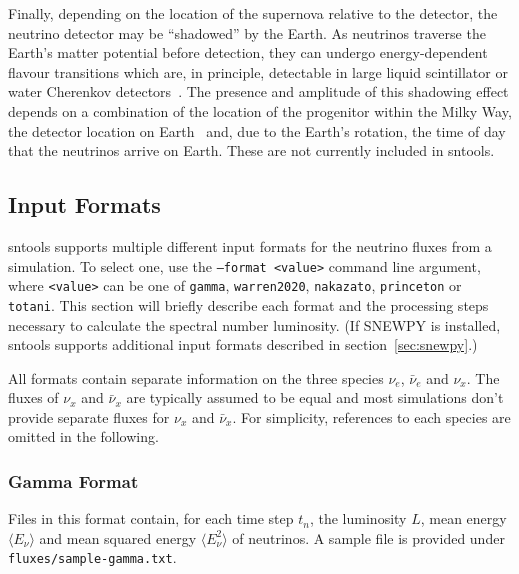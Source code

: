 \documentclass[11pt, oneside]{article}
\newcommand{\mean}[1]{\ensuremath{\langle #1 \rangle}}
\newcommand{\nue}{\ensuremath{\nu_e}\xspace}
\newcommand{\nux}{\ensuremath{\nu_x}\xspace}
\newcommand{\nuebar}{\ensuremath{\bar{\nu}_e}\xspace}
\newcommand{\nuxbar}{\ensuremath{\bar{\nu}_x}\xspace}
\begin{document}
{Finally, depending on the location of the supernova relative to the detector, the neutrino detector may be “shadowed” by the Earth.
As neutrinos traverse the Earth’s matter potential before detection, they can undergo energy-dependent flavour transitions which are, in principle, detectable in large liquid scintillator or water Cherenkov detectors~\cite{Dighe2003}.
The presence and amplitude of this shadowing effect depends on a combination of the location of the progenitor within the Milky Way, the detector location on Earth~\cite{Mirizzi2006} and, due to the Earth’s rotation, the time of day that the neutrinos arrive on Earth.
These are not currently included in sntools.%
}


\subsection{Input Formats} \label{sec:input-formats}
sntools supports multiple different input formats for the neutrino fluxes from a simulation.
To select one, use the \texttt{--format <value>} command line argument, where \texttt{<value>} can be one of \texttt{gamma}, \texttt{warren2020}, \texttt{nakazato}, \texttt{princeton} or \texttt{totani}.
This section will briefly describe each format and the processing steps necessary to calculate the spectral number luminosity.
(If SNEWPY is installed, sntools supports additional input formats described in section~\ref{sec:snewpy}.)

All formats contain separate information on the three species \nue, \nuebar and \nux.
The fluxes of \nux and \nuxbar are typically assumed to be equal and most simulations don’t provide separate fluxes for \nux and \nuxbar.
For simplicity, references to each species are omitted in the following.

\subsubsection{Gamma Format}\label{sec:format-gamma}
Files in this format contain, for each time step $t_n$, the luminosity $L$, mean energy $\mean{E_\nu}$ and mean squared energy $\mean{E_\nu^2}$ of neutrinos.
A sample file is provided under \texttt{fluxes/sample-gamma.txt}.
%
\end{document}
